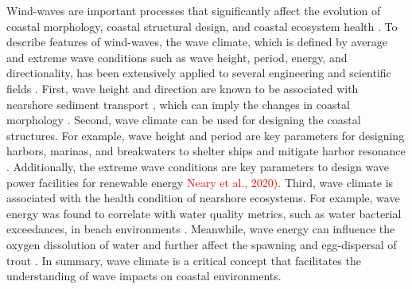 Wind-waves are important processes that significantly affect the evolution of coastal morphology, coastal structural design, and coastal ecosystem health \citep{casas-prat_wind-wave_2024}. To describe features of wind-waves, the wave climate, which is defined by average and extreme wave conditions such as wave height, period, energy, and directionality, has been extensively applied to several engineering and scientific fields \citep{wiegel_oceanographical_1964,wiegel_oceanographical_2013}. First, wave height and direction are known to be associated with nearshore sediment transport \citep{pethick_introduction_1984,davila_promoting_2014}, which can imply the changes in coastal morphology \citep{lamoe_wave_1989,benumof_relationship_2000,brown_factors_2005}. Second, wave climate can be used for designing the coastal structures. For example, wave height and period are key parameters for designing harbors, marinas, and breakwaters to shelter ships and mitigate harbor resonance \citep{belvoir_problems_1981,usace_hydraulic_1984,rabinovich_seiches_2009}. Additionally, the extreme wave conditions are key parameters to design wave power facilities for renewable energy \citep{guillou_wave_2020} \textcolor{red}{Neary et al., 2020)}. Third, wave climate is associated with the health condition of nearshore ecosystems. For example, wave energy was found to correlate with water quality metrics, such as water bacterial exceedances, in beach environments \citep{feng_wave_2016}. Meanwhile, wave energy can influence the oxygen dissolution of water and further affect the spawning and egg-dispersal of trout \citep{sly_interstitial_1988,fitzsimons_relationship_2014}. In summary, wave climate is a critical concept that facilitates the understanding of wave impacts on coastal environments.

